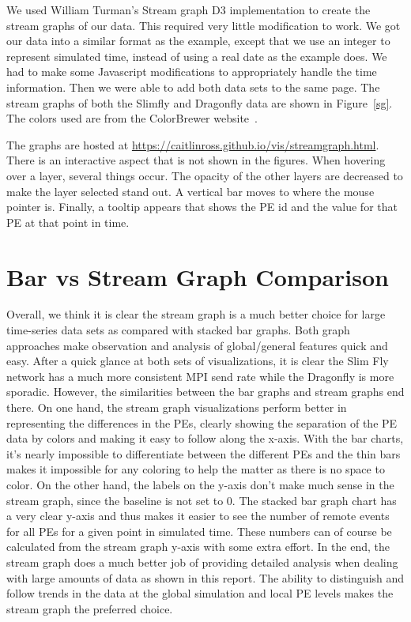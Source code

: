 \documentclass[12pt]{article}
\begin{document}
We used William Turman's Stream graph D3 implementation \cite{Stream} to create the stream graphs of our data.  This required very little modification to work.  We got our data into a similar format as the example, except that we use an integer to represent simulated time, instead of using a real date as the example does.  We had to make some Javascript modifications to appropriately handle the time information.  Then we were able to add both data sets to the same page.   The stream graphs of both the Slimfly and Dragonfly data are shown in Figure~\ref{sg}.  The colors used are from the ColorBrewer website~\cite{Colorbrewer}.

The graphs are hosted at \url{https://caitlinross.github.io/vis/streamgraph.html}.  There is an interactive aspect that is not shown in the figures.  When hovering over a layer, several things occur.  The opacity of the other layers are decreased to make the layer selected stand out.  A vertical bar moves to where the mouse pointer is.  Finally, a tooltip appears that shows the PE id and the value for that PE at that point in time.


\section{Bar vs Stream Graph Comparison}
Overall, we think it is clear the stream graph is a much better choice for large time-series data sets as compared with stacked bar graphs. Both graph approaches make observation and analysis of global/general features quick and easy. After a quick glance at both sets of visualizations, it is clear the Slim Fly network has a much more consistent MPI send rate while the Dragonfly is more sporadic. However, the similarities between the bar graphs and stream graphs end there. On one hand, the stream graph visualizations perform better in representing the differences in the PEs, clearly showing the separation of the PE data by colors and making it easy to follow along the x-axis. With the bar charts, it's nearly impossible to differentiate between the different PEs and the thin bars makes it impossible for any coloring to help the matter as there is no space to color. On the other hand, the labels on the y-axis don't make much sense in the stream graph, since the baseline is not set to 0. The stacked bar graph chart has a very clear y-axis and thus makes it easier to see the number of remote events for all PEs for a given point in simulated time. These numbers can of course be calculated from the stream graph y-axis with some extra effort. In the end, the stream graph does a much better job of providing detailed analysis when dealing with large amounts of data as shown in this report. The ability to distinguish and follow trends in the data at the global simulation and local PE levels makes the stream graph the preferred choice.
 


\end{document}

